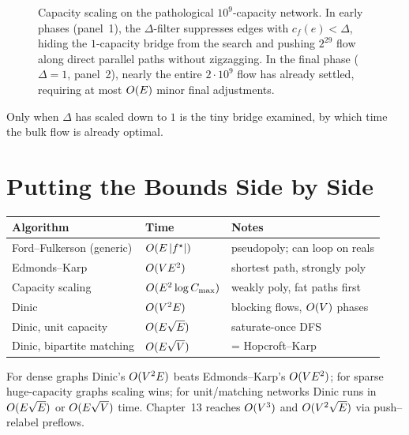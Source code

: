 \begin{figure}[H]
\caption{Capacity scaling on the pathological $10^9$-capacity network. In early phases (panel~1), the $\Delta$-filter suppresses edges with $c_f(e)<\Delta$, hiding the $1$-capacity bridge from the search and pushing $2^{29}$ flow along direct parallel paths without zigzagging. In the final phase ($\Delta=1$, panel~2), nearly the entire $2\cdot 10^9$ flow has already settled, requiring at most $O(E)$ minor final adjustments.}
\label{ch12:fig-scaling-filter}
\end{figure}

Only when $\Delta$ has scaled down to $1$ is the tiny bridge examined, by which time the bulk flow is already optimal.

\section{Putting the Bounds Side by Side}
\label{ch12:summary}

\begin{center}
\begin{tabular}{@{}lll@{}}
\toprule
Algorithm & Time & Notes \\
\midrule
Ford--Fulkerson (generic) & $O(E\,\lvert f^\star\rvert)$ & pseudopoly; can loop on reals \\
Edmonds--Karp & $O(VE^2)$ & shortest path, strongly poly \\
Capacity scaling & $O(E^2\log C_{\max})$ & weakly poly, fat paths first \\
Dinic & $O(V^2E)$ & blocking flows, $O(V)$ phases \\
Dinic, unit capacity & $O(E\sqrt{E})$ & saturate-once DFS \\
Dinic, bipartite matching & $O(E\sqrt{V})$ & = Hopcroft--Karp \\
\bottomrule
\end{tabular}
\end{center}

For dense graphs Dinic's $O(V^2E)$ beats Edmonds--Karp's $O(VE^2)$; for sparse
huge-capacity graphs scaling wins; for unit/matching networks Dinic runs in
$O(E\sqrt{E})$ or $O(E\sqrt{V})$ time. Chapter~13 reaches $O(V^3)$ and
$O(V^2\sqrt E)$ via push--relabel preflows.


